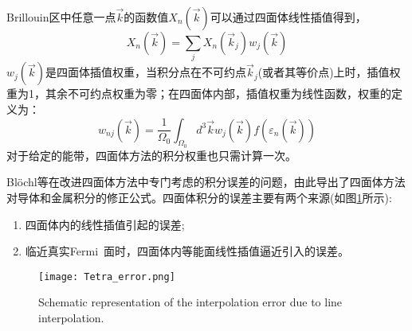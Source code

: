 Brillouin区中任意一点$\vec k$的函数值$X_n(\vec k)$可以通过四面体线性插值得到，
\begin{equation}
  X_n(\vec k)=\sum_jX_n(\vec k_j)w_j(\vec k)
  \label{eq:solid-208}
\end{equation}
$w_j(\vec k)$是四面体插值权重，当积分点在不可约点$\vec k_j$(或者其等价点)上时，插值权重为1，其余不可约点权重为零；在四面体内部，插值权重为线性函数，权重的定义为：
\begin{equation}
	w_{nj}(\vec k)=\frac1{\Omega_0}\int_{\Omega_0}d^3\vec kw_j(\vec k)f(\varepsilon_n(\vec k))
	\label{eq:solid-209}
\end{equation}
对于给定的能带，四面体方法的积分权重也只需计算一次。

\textrm{Bl\"ochl}等在改进四面体方法中专门考虑的积分误差的问题，由此导出了四面体方法对导体和金属积分的修正公式。四面体积分的误差主要有两个来源(如图\ref{Fig:Tetra_error}所示):
	\begin{enumerate}
		\item 四面体内的线性插值引起的误差;~
		\item 临近真实\textrm{Fermi~}面时，四面体内等能面线性插值逼近引入的误差。
	\end{enumerate}
\begin{figure}[h!]
\centering
\vspace*{-0.28in}
\texttt{[image: Tetra\_error.png]}
\caption{\small Schematic representation of the interpolation error due to line interpolation.}%
\label{Fig:Tetra_error}
\end{figure}

